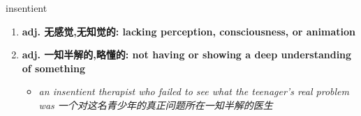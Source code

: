
\begin{frame}
{\huge insentient}
\begin{center}
\begin{enumerate}\Large
  \item \textbf{adj. 无感觉,无知觉的: lacking perception, consciousness, or animation}
  \item \textbf{adj. 一知半解的,略懂的: not having or showing a deep understanding of something}
  \begin{itemize}
    \item \em{\Large{an insentient therapist who failed to see what the teenager's real problem was 一个对这名青少年的真正问题所在一知半解的医生}}
  \end{itemize}
\end{enumerate}
\end{center}
\end{frame}
